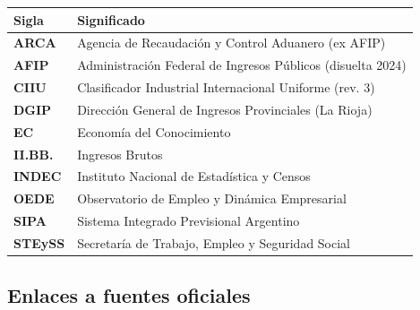 \documentclass[
  spanish,
  letterpaper,
  DIV=11,
  numbers=noendperiod]{scrartcl}
\newcounter{none} %
\begin{document}
{\def\LTcaptype{none} %
\begin{longtable}[]{@{}
  >{\raggedright\arraybackslash}p{}
  >{\raggedright\arraybackslash}p{}@{}}
\toprule\noalign{}
\begin{minipage}[b]{\linewidth}\raggedright
Sigla
\end{minipage} & \begin{minipage}[b]{\linewidth}\raggedright
Significado
\end{minipage} \\
\midrule\noalign{}
\endhead
\bottomrule\noalign{}
\endlastfoot
\textbf{ARCA} & Agencia de Recaudación y Control Aduanero (ex AFIP) \\
\textbf{AFIP} & Administración Federal de Ingresos Públicos (disuelta
2024) \\
\textbf{CIIU} & Clasificador Industrial Internacional Uniforme (rev.
3) \\
\textbf{DGIP} & Dirección General de Ingresos Provinciales (La Rioja) \\
\textbf{EC} & Economía del Conocimiento \\
\textbf{II.BB.} & Ingresos Brutos \\
\textbf{INDEC} & Instituto Nacional de Estadística y Censos \\
\textbf{OEDE} & Observatorio de Empleo y Dinámica Empresarial \\
\textbf{SIPA} & Sistema Integrado Previsional Argentino \\
\textbf{STEySS} & Secretaría de Trabajo, Empleo y Seguridad Social \\
\end{longtable}
}

\subsection{Enlaces a fuentes
oficiales}\label{enlaces-a-fuentes-oficiales}
\end{document}

